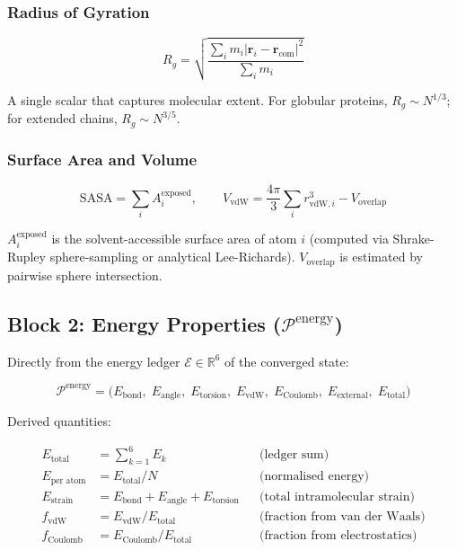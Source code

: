 \documentclass[11pt, a4paper, oneside]{article}
\theoremstyle{definition}
\theoremstyle{remark}
\newcommand{\R}{\mathbb{R}}
\begin{document}
\subsubsection{Radius of Gyration}

\begin{equation}
R_g = \sqrt{\frac{\sum_i m_i |\mathbf{r}_i - \mathbf{r}_{\text{com}}|^2}
                  {\sum_i m_i}}
\end{equation}

A single scalar that captures molecular extent.  For globular proteins,
$R_g \sim N^{1/3}$; for extended chains, $R_g \sim N^{3/5}$.

\subsubsection{Surface Area and Volume}

\begin{equation}
\text{SASA} = \sum_i A_i^{\text{exposed}},
\qquad
V_{\text{vdW}} = \frac{4\pi}{3}\sum_i r_{\text{vdW},i}^3
  - V_{\text{overlap}}
\end{equation}

$A_i^{\text{exposed}}$ is the solvent-accessible surface area of
atom $i$ (computed via Shrake-Rupley sphere-sampling or analytical Lee-Richards).
$V_{\text{overlap}}$ is estimated by pairwise sphere intersection.

\subsection{Block 2: Energy Properties ($\mathcal{P}^{\text{energy}}$)}
\label{sec:block-energy}

Directly from the energy ledger $\mathcal{E} \in \R^6$ of the converged
state:

\begin{equation}
\mathcal{P}^{\text{energy}} = \bigl(
  E_{\text{bond}},\;
  E_{\text{angle}},\;
  E_{\text{torsion}},\;
  E_{\text{vdW}},\;
  E_{\text{Coulomb}},\;
  E_{\text{external}},\;
  E_{\text{total}}
\bigr)
\end{equation}

Derived quantities:

\begin{align}
E_{\text{total}} &= \sum_{k=1}^{6} E_k  && \text{(ledger sum)} \\
E_{\text{per atom}} &= E_{\text{total}} / N
  && \text{(normalised energy)} \\
E_{\text{strain}} &= E_{\text{bond}} + E_{\text{angle}} + E_{\text{torsion}}
  && \text{(total intramolecular strain)} \\
f_{\text{vdW}} &= E_{\text{vdW}} / E_{\text{total}}
  && \text{(fraction from van der Waals)} \\
f_{\text{Coulomb}} &= E_{\text{Coulomb}} / E_{\text{total}}
  && \text{(fraction from electrostatics)}
\end{align}
\end{document}
